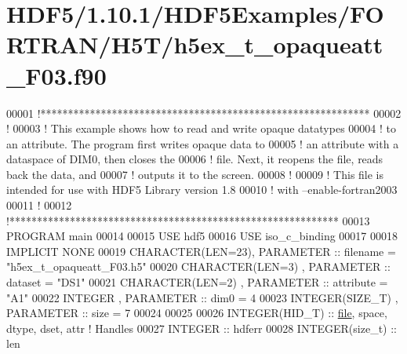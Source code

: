 \hypertarget{_h_d_f5_21_810_81_2_h_d_f5_examples_2_f_o_r_t_r_a_n_2_h5_t_2h5ex__t__opaqueatt___f03_8f90_source}{}\section{H\+D\+F5/1.10.1/\+H\+D\+F5\+Examples/\+F\+O\+R\+T\+R\+A\+N/\+H5\+T/h5ex\+\_\+t\+\_\+opaqueatt\+\_\+\+F03.f90}
\label{_h_d_f5_21_810_81_2_h_d_f5_examples_2_f_o_r_t_r_a_n_2_h5_t_2h5ex__t__opaqueatt___f03_8f90_source}

\begin{DoxyCode}
00001 \textcolor{comment}{!************************************************************}
00002 \textcolor{comment}{!}
00003 \textcolor{comment}{!  This example shows how to read and write opaque datatypes}
00004 \textcolor{comment}{!  to an attribute.  The program first writes opaque data to}
00005 \textcolor{comment}{!  an attribute with a dataspace of DIM0, then closes the}
00006 \textcolor{comment}{!  file. Next, it reopens the file, reads back the data, and}
00007 \textcolor{comment}{!  outputs it to the screen.}
00008 \textcolor{comment}{!}
00009 \textcolor{comment}{!  This file is intended for use with HDF5 Library version 1.8}
00010 \textcolor{comment}{!  with --enable-fortran2003}
00011 \textcolor{comment}{!}
00012 \textcolor{comment}{!************************************************************}
00013 \textcolor{keyword}{PROGRAM} main
00014 
00015   \textcolor{keywordtype}{USE }hdf5
00016   \textcolor{keywordtype}{USE }iso\_c\_binding
00017 
00018   \textcolor{keywordtype}{IMPLICIT NONE}
00019   \textcolor{keywordtype}{CHARACTER(LEN=23)}, \textcolor{keywordtype}{PARAMETER} :: filename  = \textcolor{stringliteral}{"h5ex\_t\_opaqueatt\_F03.h5"}
00020   \textcolor{keywordtype}{CHARACTER(LEN=3)} , \textcolor{keywordtype}{PARAMETER} :: dataset   = \textcolor{stringliteral}{"DS1"}
00021   \textcolor{keywordtype}{CHARACTER(LEN=2)} , \textcolor{keywordtype}{PARAMETER} :: attribute = \textcolor{stringliteral}{"A1"}
00022   \textcolor{keywordtype}{INTEGER}          , \textcolor{keywordtype}{PARAMETER} :: dim0      = 4
00023   \textcolor{keywordtype}{INTEGER(SIZE\_T)}  , \textcolor{keywordtype}{PARAMETER} :: size      = 7
00024   
00025 
00026   \textcolor{keywordtype}{INTEGER(HID\_T)}  :: \hyperlink{structfile}{file}, space, dtype, dset, attr \textcolor{comment}{! Handles}
00027   \textcolor{keywordtype}{INTEGER} :: hdferr
00028   \textcolor{keywordtype}{INTEGER(size\_t)} :: len

\end{DoxyCode}

